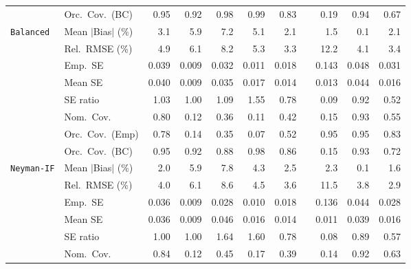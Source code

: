 \begin{landscape}
\begin{longtable}{llrrrrrrrrr}
 & Orc.\ Cov.\ (BC) & \cellcolor{rankone}0.95 & \cellcolor{rankthree}0.92 & \cellcolor{rankthree}0.98 & 0.99 & 0.83 &  & 0.19 & \cellcolor{ranktwo}0.94 & 0.67 \\
\addlinespace[2pt]
\quad \texttt{Balanced} & Mean $|$Bias$|$ (\%) & 3.1 & 5.9 & 7.2 & 5.1 & \cellcolor{rankthree}2.1 &  & \cellcolor{ranktwo}1.5 & \cellcolor{rankone}0.1 & \cellcolor{rankthree}2.1 \\
 & Rel.\ RMSE (\%) & 4.9 & 6.1 & 8.2 & 5.3 & \cellcolor{rankone}3.3 &  & 12.2 & \cellcolor{rankthree}4.1 & \cellcolor{ranktwo}3.4 \\
 & Emp.\ SE & 0.039 & 0.009 & 0.032 & 0.011 & 0.018 &  & 0.143 & 0.048 & 0.031 \\
 & Mean SE & 0.040 & 0.009 & 0.035 & 0.017 & 0.014 &  & 0.013 & 0.044 & 0.016 \\
 & SE ratio & \cellcolor{ranktwo}1.03 & \cellcolor{rankone}1.00 & 1.09 & 1.55 & 0.78 &  & 0.09 & \cellcolor{rankthree}0.92 & 0.52 \\
 & Nom.\ Cov. & \cellcolor{ranktwo}0.80 & 0.12 & 0.36 & 0.11 & 0.42 &  & 0.15 & \cellcolor{rankone}0.93 & \cellcolor{rankthree}0.55 \\
 & Orc.\ Cov.\ (Emp) & \cellcolor{rankthree}0.78 & 0.14 & 0.35 & 0.07 & 0.52 &  & \cellcolor{rankone}0.95 & \cellcolor{rankone}0.95 & \cellcolor{ranktwo}0.83 \\
 & Orc.\ Cov.\ (BC) & \cellcolor{rankone}0.95 & \cellcolor{rankthree}0.92 & 0.88 & \cellcolor{rankthree}0.98 & 0.86 &  & 0.15 & \cellcolor{ranktwo}0.93 & 0.72 \\
\addlinespace[2pt]
\quad \texttt{Neyman-IF} & Mean $|$Bias$|$ (\%) & \cellcolor{rankthree}2.0 & 5.9 & 7.8 & 4.3 & 2.5 &  & 2.3 & \cellcolor{rankone}0.1 & \cellcolor{ranktwo}1.6 \\
 & Rel.\ RMSE (\%) & 4.0 & 6.1 & 8.6 & 4.5 & \cellcolor{ranktwo}3.6 &  & 11.5 & \cellcolor{rankthree}3.8 & \cellcolor{rankone}2.9 \\
 & Emp.\ SE & 0.036 & 0.009 & 0.028 & 0.010 & 0.018 &  & 0.136 & 0.044 & 0.028 \\
 & Mean SE & 0.036 & 0.009 & 0.046 & 0.016 & 0.014 &  & 0.011 & 0.039 & 0.016 \\
 & SE ratio & \cellcolor{rankone}1.00 & \cellcolor{rankone}1.00 & 1.64 & 1.60 & \cellcolor{rankthree}0.78 &  & 0.08 & \cellcolor{ranktwo}0.89 & 0.57 \\
 & Nom.\ Cov. & \cellcolor{ranktwo}0.84 & 0.12 & 0.45 & 0.17 & 0.39 &  & 0.14 & \cellcolor{rankone}0.92 & \cellcolor{rankthree}0.63 \\

\end{longtable}
\end{landscape}
